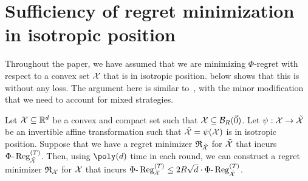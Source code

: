 \section{Sufficiency of regret minimization in isotropic position}
\label{sec:isotropic}

Throughout the paper, we have assumed that we are minimizing $\Phi$-regret with respect to a convex set ${\mathcal{X}}$ that is in isotropic position.  below shows that this is without any loss. The argument here is similar to~\citet[Lemma A.1]{Daskalakis24:Efficient}, with the minor modification that we need to account for mixed strategies.

\begin{lemma}
    \label{lemma:isotropic}
    Let ${\mathcal{X}} \subseteq \mathbb R^d$ be a convex and compact set such that ${\mathcal{X}} \subseteq {\mathcal{B}}_R(\vec{0})$. Let $\psi : {\mathcal{X}} \to \tilde{{\mathcal{X}}}$ be an invertible affine transformation such that $\tilde{{\mathcal{X}}} = \psi({\mathcal{X}})$ is in isotropic position. Suppose that we have a regret minimizer $\mathfrak{R}_{\tilde{{\mathcal{X}}}}$ for $\tilde{{\mathcal{X}}}$ that incurs $\Phi\text{-}\operatorname{Reg}_{\tilde{{\mathcal{X}}}}^{(T)}$. Then, using $\poly(d)$ time in each round, we can construct a regret minimizer $\mathfrak{R}_{{\mathcal{X}}}$ for ${\mathcal{X}}$ that incurs $\Phi\text{-}\operatorname{Reg}^{(T)}_{{\mathcal{X}}} \leq 2R \sqrt{d} \cdot \Phi\text{-}\operatorname{Reg}^{(T)}_{\tilde{{\mathcal{X}}}}$.
\end{lemma}

